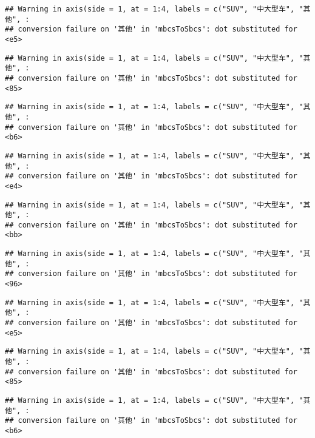 \documentclass[]{article}
\begin{document}
\begin{verbatim}
## Warning in axis(side = 1, at = 1:4, labels = c("SUV", "中大型车", "其他", :
## conversion failure on '其他' in 'mbcsToSbcs': dot substituted for <e5>
\end{verbatim}

\begin{verbatim}
## Warning in axis(side = 1, at = 1:4, labels = c("SUV", "中大型车", "其他", :
## conversion failure on '其他' in 'mbcsToSbcs': dot substituted for <85>
\end{verbatim}

\begin{verbatim}
## Warning in axis(side = 1, at = 1:4, labels = c("SUV", "中大型车", "其他", :
## conversion failure on '其他' in 'mbcsToSbcs': dot substituted for <b6>
\end{verbatim}

\begin{verbatim}
## Warning in axis(side = 1, at = 1:4, labels = c("SUV", "中大型车", "其他", :
## conversion failure on '其他' in 'mbcsToSbcs': dot substituted for <e4>
\end{verbatim}

\begin{verbatim}
## Warning in axis(side = 1, at = 1:4, labels = c("SUV", "中大型车", "其他", :
## conversion failure on '其他' in 'mbcsToSbcs': dot substituted for <bb>
\end{verbatim}

\begin{verbatim}
## Warning in axis(side = 1, at = 1:4, labels = c("SUV", "中大型车", "其他", :
## conversion failure on '其他' in 'mbcsToSbcs': dot substituted for <96>
\end{verbatim}

\begin{verbatim}
## Warning in axis(side = 1, at = 1:4, labels = c("SUV", "中大型车", "其他", :
## conversion failure on '其他' in 'mbcsToSbcs': dot substituted for <e5>
\end{verbatim}

\begin{verbatim}
## Warning in axis(side = 1, at = 1:4, labels = c("SUV", "中大型车", "其他", :
## conversion failure on '其他' in 'mbcsToSbcs': dot substituted for <85>
\end{verbatim}

\begin{verbatim}
## Warning in axis(side = 1, at = 1:4, labels = c("SUV", "中大型车", "其他", :
## conversion failure on '其他' in 'mbcsToSbcs': dot substituted for <b6>
\end{verbatim}
\end{document}
